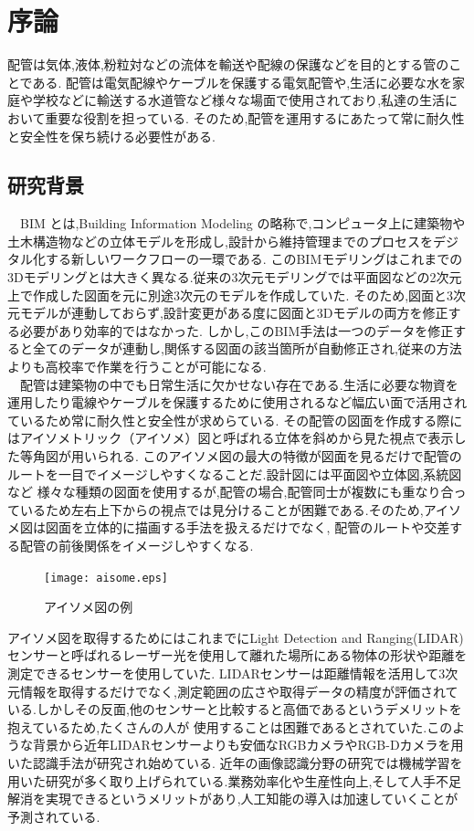 \chapter{%
序論}

配管は気体,液体,粉粒対などの流体を輸送や配線の保護などを目的とする管のことである.
配管は電気配線やケーブルを保護する電気配管や,生活に必要な水を家庭や学校などに輸送する水道管など様々な場面で使用されており,私達の生活において重要な役割を担っている.
そのため,配管を運用するにあたって常に耐久性と安全性を保ち続ける必要性がある. \\

\section{研究背景}
　BIM とは,Building Information Modeling の略称で,コンピュータ上に建築物や土木構造物などの立体モデルを形成し,設計から維持管理までのプロセスをデジタル化する新しいワークフローの一環である.
このBIMモデリングはこれまでの3Dモデリングとは大きく異なる.従来の3次元モデリングでは平面図などの2次元上で作成した図面を元に別途3次元のモデルを作成していた.
そのため,図面と3次元モデルが連動しておらず,設計変更がある度に図面と3Dモデルの両方を修正する必要があり効率的ではなかった.
しかし,このBIM手法は一つのデータを修正すると全てのデータが連動し,関係する図面の該当箇所が自動修正され,従来の方法よりも高校率で作業を行うことが可能になる.\\
　配管は建築物の中でも日常生活に欠かせない存在である.生活に必要な物資を運用したり電線やケーブルを保護するために使用されるなど幅広い面で活用されているため常に耐久性と安全性が求めらている.
その配管の図面を作成する際にはアイソメトリック（アイソメ）図と呼ばれる立体を斜めから見た視点で表示した等角図が用いられる.
このアイソメ図の最大の特徴が図面を見るだけで配管のルートを一目でイメージしやすくなることだ.設計図には平面図や立体図,系統図など
様々な種類の図面を使用するが,配管の場合,配管同士が複数にも重なり合っているため左右上下からの視点では見分けることが困難である.そのため,アイソメ図は図面を立体的に描画する手法を扱えるだけでなく,
配管のルートや交差する配管の前後関係をイメージしやすくなる.\\
\begin{figure}[htbt]
	\centering
	 \texttt{[image: aisome.eps]}
	 \caption{アイソメ図の例}
	 \label{fig:f1}
\end{figure}

アイソメ図を取得するためにはこれまでにLight Detection and Ranging(LIDAR)センサーと呼ばれるレーザー光を使用して離れた場所にある物体の形状や距離を測定できるセンサーを使用していた.
LIDARセンサーは距離情報を活用して3次元情報を取得するだけでなく,測定範囲の広さや取得データの精度が評価されている.しかしその反面,他のセンサーと比較すると高価であるというデメリットを抱えているため,たくさんの人が
使用することは困難であるとされていた.このような背景から近年LIDARセンサーよりも安価なRGBカメラやRGB-Dカメラを用いた認識手法が研究され始めている.
近年の画像認識分野の研究では機械学習を用いた研究が多く取り上げられている.業務効率化や生産性向上,そして人手不足解消を実現できるというメリットがあり,人工知能の導入は加速していくことが予測されている.

